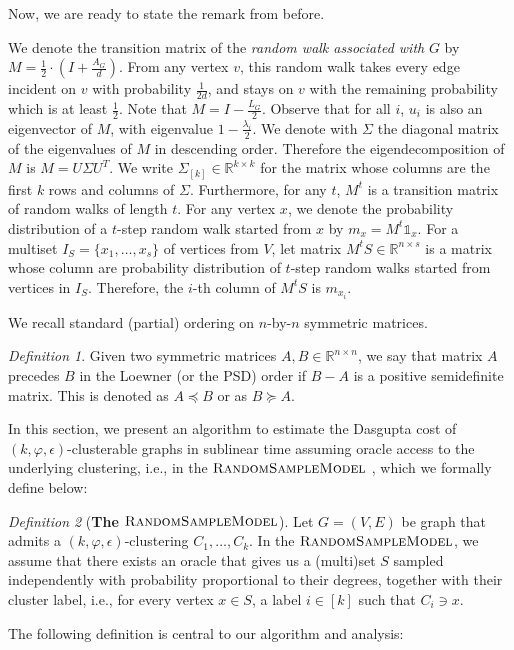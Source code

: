 \documentclass[letterpaper,11pt]{article}
\newcommand{\rsm}{\textsc{RandomSampleModel}}
\newcommand{\R}{\mathbb{R}}
\theoremstyle{plain}
\theoremstyle{definition}
\theoremstyle{remark}
\newtheorem{mydef}{Definition}
\newcommand{\e}{\epsilon}
\begin{document}
\GLKMlemma*

Now, we are ready to state the remark from before.
\subspacewelldefine*

We denote the transition matrix of the \textit{random walk associated with} $G$ by $M=\frac{1}{2}\cdot \left(I+\frac{A_G}{d}\right)$. From any vertex $v$, this random walk takes every edge incident on $v$ with probability $\frac{1}{2d}$, and stays on $v$ with the remaining probability which is at least $\frac{1}{2}$. Note that $M=I-\frac{L_G}{2}$. Observe that for all $i$, $u_i$ is also an eigenvector of $M$, with eigenvalue $1-\frac{\lambda_i}{2}$.
We denote with $\Sigma$ the diagonal matrix of the eigenvalues of $M$ in descending order.  Therefore the eigendecomposition of $M$ is $M=U \Sigma U^T$. We  write $\Sigma_{[k]}\in \R^{k\times k}$ for the matrix whose columns are the first $k$ rows and columns of $\Sigma$. Furthermore, for any $t$, $M^t$ is a transition matrix of random walks of length $t$. For any vertex $x$, we denote the probability distribution of a $t$-step random walk started from $x$ by $m_x=M^t \mathds{1}_x$. For a multiset $I_S=\{x_1,\ldots,x_s\}$ of vertices from $V$, let matrix $M^t S \in \R^{n\times s}$ is a matrix whose column are probability distribution of $t$-step random walks started from vertices in $I_S$. Therefore, the $i$-th column of $M^t S$ is $m_{x_i}$.



  
We recall standard (partial) ordering on $n$-by-$n$ symmetric matrices.
\begin{mydef} \label{def:lowener:order}
	Given two symmetric matrices $A, B \in \R^{n \times n}$, we say that matrix $A$
	precedes $B$ in the Loewner (or the PSD) order if $B - A$ is a positive semidefinite
	matrix. This is denoted as $A \preceq B$ or as $B \succeq A$. 
\end{mydef}
 


In this section, we present an algorithm to estimate the Dasgupta cost of  $(k, \varphi, \e)$-clusterable graphs in sublinear time assuming oracle access to the underlying clustering, i.e., in the \linebreak $\rsm$ , which we formally define below: 
\begin{mydef}[\textbf{The $\rsm$}]
\label{def:ss:model} 
	Let $G = (V,E)$ be graph that admits a $(k,\varphi,\epsilon)$-clustering $C_1,\ldots, C_k$. In the $\rsm$, we assume that there exists an oracle that gives us a (multi)set $S$ sampled independently with probability proportional to their degrees, together with their cluster label, i.e., for every vertex $x\in S$, a label $i \in [k]$ such that $C_i \ni x$.  
\end{mydef}
The following definition is central to our algorithm and analysis:
\end{document}
